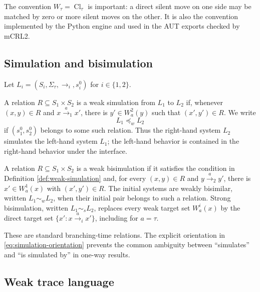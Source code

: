 \documentclass{ws-jbcb}
\numberwithin{equation}{section}
\newcommand{\TAU}{\tau}
\newcommand{\strongsim}{\mathrel{\sim_{s}}}
\newcommand{\weaksim}{\mathrel{\sim_{w}}}
\newcommand{\weakpre}{\mathrel{\preceq_{w}}}
\begin{document}
The convention $W_{\TAU}=\operatorname{Cl}_{\TAU}$ is important: a direct silent
move on one side may be matched by zero or more silent moves on the other. It is
also the convention implemented by the Python engine and used in the AUT exports
checked by mCRL2.

\subsection{Simulation and bisimulation}\label{sec:relations}

Let $L_i=(S_i,\Sigma_{\TAU},\longrightarrow_i,s_i^0)$ for $i\in\{1,2\}$.

\begin{definition}\label{def:weak-simulation}
A relation $R\subseteq S_1\times S_2$ is a weak simulation from $L_1$ to $L_2$
if, whenever $(x,y)\in R$ and $x\xrightarrow{a}_1x'$, there is
$y'\in W_a^2(y)$ such that $(x',y')\in R$. We write
\begin{equation}\label{eq:simulation-orientation}
 L_1\weakpre L_2
\end{equation}
if $(s_1^0,s_2^0)$ belongs to some such relation. Thus the right-hand system
$L_2$ simulates the left-hand system $L_1$; the left-hand behavior is contained
in the right-hand behavior under the interface.
\end{definition}

\begin{definition}\label{def:bisimulation}
A relation $R\subseteq S_1\times S_2$ is a weak bisimulation if it satisfies the
condition in Definition \ref{def:weak-simulation} and, for every $(x,y)\in R$ and
$y\xrightarrow{a}_2y'$, there is $x'\in W_a^1(x)$ with $(x',y')\in R$. The
initial systems are weakly bisimilar, written $L_1\weaksim L_2$, when their
initial pair belongs to such a relation. Strong bisimulation, written
$L_1\strongsim L_2$, replaces every weak target set $W_a^i(x)$ by the direct
target set $\{x':x\xrightarrow{a}_i x'\}$, including for $a=\TAU$.
\end{definition}

These are standard branching-time relations.\cite{Milner1989,Sangiorgi2011}
The explicit orientation in \eqref{eq:simulation-orientation} prevents the common
ambiguity between ``simulates'' and ``is simulated by'' in one-way results.

\subsection{Weak trace language}\label{sec:trace-language}
\end{document}
